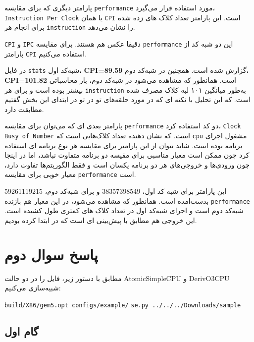 \documentclass[12pt]{exam}
\begin{document}
\begin{multicols}{1}
	پارامتر دیگری که برای مقایسه \texttt{performance} مورد استفاده قرار می‌گیرد، \texttt{Instruction Per Clock} یا همان \texttt{CPI} است. این پارامتر تعداد کلاک های زده شده برای انجام هر \texttt{instruction} را نشان می‌دهد.
	
	\texttt{CPI} و \texttt{IPC} دقیقا عکس هم هستند. برای مقایسه \texttt{performance} این دو شبه کد از پارامتر \texttt{CPI} استفاده می‌کنیم.
	
	در فایل \texttt{stats} شبه‌کد اول، \textbf{CPI=89.59} گزارش شده است.
	همچنین در شبه‌کد دوم، \textbf{CPI=101.82} است. همانطور که مشاهده می‌شود در شبه‌کد دوم، بار محاسباتی بیشتر بوده است و برای هر \texttt{instruction} به‌طور میانگین ۱۰۱ لبه کلاک مصرف شده است. که این تحلیل با نکته ای که در مورد حلقه‌های تو در تو در ابتدای این بخش گفتیم مطابقت دارد.
	
	پارامتر بعدی ای که می‌توان برای مقایسه \texttt{performance} دو کد استفاده کرد، \texttt{Clock Busy of Number} است. که نشان دهنده تعداد کلاک‌هایی است که \texttt{cpu} مشغول اجرای برنامه بوده است. شاید نتوان از این پارامتر برای مقایسه هر نوع برنامه ای استفاده کرد چون ممکن است معیار مناسبی برای مقیسه دو برنامه متفاوت نباشد، اما در اینجا چون ورودی‌ها و خروجی‌های هر دو برنامه یکسان است و فقط الگوریتم‌ها تفاوت دارد، معیار خوبی برای مقایسه \texttt{performance} است.
	
	این پارامتر برای شبه کد اول، 38357398549 و برای شبه‌کد دوم، 59261119215 بدست‌امده است. همانطور که مشاهده می‌شود، در این معیار هم بازنده \texttt{performance} شبه‌کد دوم است و اجرای شبه‌کد اول در تعداد کلاک های کمتری طول کشیده است. این خروجی هم مطابق با پیش‌بینی ای است که در ابتدا کرده بودیم.
	
	
	
	
	
	
	
	
	
	
	
	
	
	
	
	
	\section{پاسخ سوال دوم}
	مطابق با دستور زیر، فایل را در دو حالت AtomicSimpleCPU و DerivO3CPU شبیه‌سازی می‌کنیم:
	\begin{latin}
		\texttt{build/X86/gem5.opt configs/example/}
		\texttt{se.py ../../../Downloads/sample}
	\end{latin}
	
	\subsection{گام اول}
	

\end{multicols}
\end{document}
